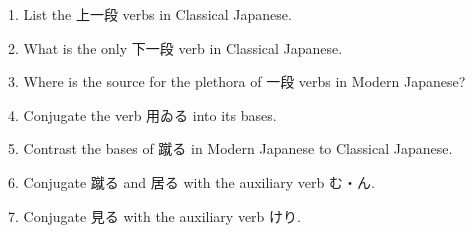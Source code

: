 \par{1. List the 上一段 verbs in Classical Japanese. }

\par{2. What is the only 下一段 verb in Classical Japanese. }

\par{3. Where is the source for the plethora of 一段 verbs in Modern Japanese? }

\par{4. Conjugate the verb 用ゐる into its bases. }

\par{5. Contrast the bases of 蹴る in Modern Japanese to Classical Japanese. }

\par{6. Conjugate 蹴る and 居る with the auxiliary verb む・ん. }

\par{7. Conjugate 見る with the auxiliary verb けり. }
    